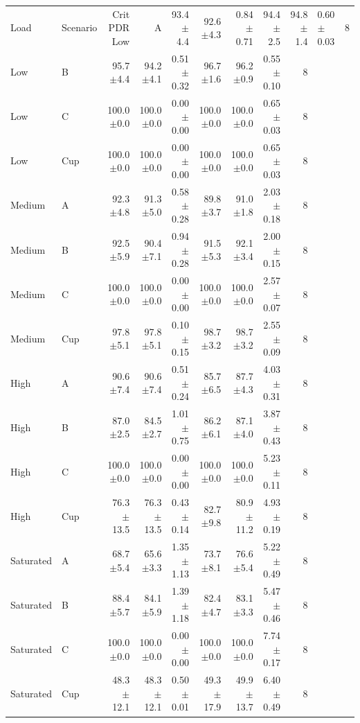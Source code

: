 \begin{tabular}{llrrrrrrr}
\toprule
Load & Scenario & Crit PDR %
\midrule
Low & A & 93.4$\pm$4.4 & 92.6$\pm$4.3 & 0.84$\pm$0.71 & 94.4$\pm$2.5 & 94.8$\pm$1.4 & 0.60$\pm$0.03 & 8 \\
Low & B & 95.7$\pm$4.4 & 94.2$\pm$4.1 & 0.51$\pm$0.32 & 96.7$\pm$1.6 & 96.2$\pm$0.9 & 0.55$\pm$0.10 & 8 \\
Low & C & 100.0$\pm$0.0 & 100.0$\pm$0.0 & 0.00$\pm$0.00 & 100.0$\pm$0.0 & 100.0$\pm$0.0 & 0.65$\pm$0.03 & 8 \\
Low & Cup & 100.0$\pm$0.0 & 100.0$\pm$0.0 & 0.00$\pm$0.00 & 100.0$\pm$0.0 & 100.0$\pm$0.0 & 0.65$\pm$0.03 & 8 \\
Medium & A & 92.3$\pm$4.8 & 91.3$\pm$5.0 & 0.58$\pm$0.28 & 89.8$\pm$3.7 & 91.0$\pm$1.8 & 2.03$\pm$0.18 & 8 \\
Medium & B & 92.5$\pm$5.9 & 90.4$\pm$7.1 & 0.94$\pm$0.28 & 91.5$\pm$5.3 & 92.1$\pm$3.4 & 2.00$\pm$0.15 & 8 \\
Medium & C & 100.0$\pm$0.0 & 100.0$\pm$0.0 & 0.00$\pm$0.00 & 100.0$\pm$0.0 & 100.0$\pm$0.0 & 2.57$\pm$0.07 & 8 \\
Medium & Cup & 97.8$\pm$5.1 & 97.8$\pm$5.1 & 0.10$\pm$0.15 & 98.7$\pm$3.2 & 98.7$\pm$3.2 & 2.55$\pm$0.09 & 8 \\
High & A & 90.6$\pm$7.4 & 90.6$\pm$7.4 & 0.51$\pm$0.24 & 85.7$\pm$6.5 & 87.7$\pm$4.3 & 4.03$\pm$0.31 & 8 \\
High & B & 87.0$\pm$2.5 & 84.5$\pm$2.7 & 1.01$\pm$0.75 & 86.2$\pm$6.1 & 87.1$\pm$4.0 & 3.87$\pm$0.43 & 8 \\
High & C & 100.0$\pm$0.0 & 100.0$\pm$0.0 & 0.00$\pm$0.00 & 100.0$\pm$0.0 & 100.0$\pm$0.0 & 5.23$\pm$0.11 & 8 \\
High & Cup & 76.3$\pm$13.5 & 76.3$\pm$13.5 & 0.43$\pm$0.14 & 82.7$\pm$9.8 & 80.9$\pm$11.2 & 4.93$\pm$0.19 & 8 \\
Saturated & A & 68.7$\pm$5.4 & 65.6$\pm$3.3 & 1.35$\pm$1.13 & 73.7$\pm$8.1 & 76.6$\pm$5.4 & 5.22$\pm$0.49 & 8 \\
Saturated & B & 88.4$\pm$5.7 & 84.1$\pm$5.9 & 1.39$\pm$1.18 & 82.4$\pm$4.7 & 83.1$\pm$3.3 & 5.47$\pm$0.46 & 8 \\
Saturated & C & 100.0$\pm$0.0 & 100.0$\pm$0.0 & 0.00$\pm$0.00 & 100.0$\pm$0.0 & 100.0$\pm$0.0 & 7.74$\pm$0.17 & 8 \\
Saturated & Cup & 48.3$\pm$12.1 & 48.3$\pm$12.1 & 0.50$\pm$0.01 & 49.3$\pm$17.9 & 49.9$\pm$13.7 & 6.40$\pm$0.49 & 8 \\
\bottomrule
\end{tabular}
